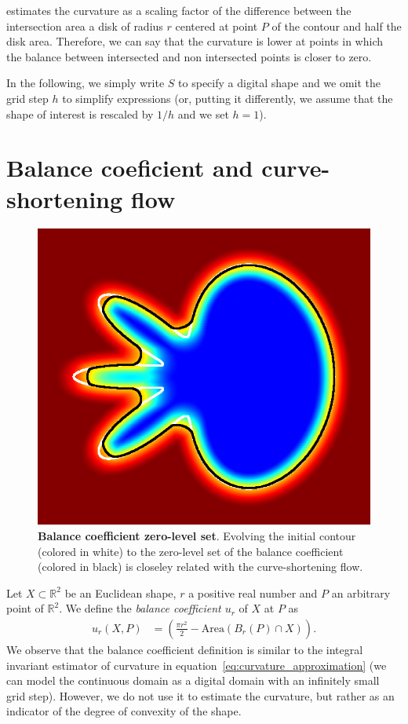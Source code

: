\documentclass[review]{siamart220329}
\newcommand{\R}{\mathbb{R}}
\begin{document}
 estimates the curvature as a scaling factor of the difference between the intersection area  a disk of radius $r$ centered at point $P$ of the contour and half the disk area. Therefore, we can say that the curvature is lower at points in which the balance between intersected and non intersected points is closer to zero.

In the following, we simply write $S$ to specify a digital shape and we omit the grid step $h$ to simplify expressions (or, putting it differently, we assume that the shape of interest is rescaled by $1/h$ and we set $h = 1$).
%
%
%
%
%
\section{Balance coeficient and curve-shortening flow}
%
%
\begin{figure}
 \center
 \includegraphics[scale=0.32]{figures/zero-level-set/balance-coefficient-zero-level-set.png}
 \caption{\textbf{Balance coefficient zero-level set}. Evolving the initial contour (colored in white) to the zero-level set of the balance coefficient (colored in black) is closeley related with the curve-shortening flow.}
 \label{fig:balance-coefficient-zero-level-set}
 \end{figure}
%
%
Let $X \subset \R^2$ be an Euclidean shape, $r$ a positive real number and $P$ an arbitrary point of $\R^2$. We define the \emph{balance coefficient $u_r$} of $X$ at $P$ as
%
%
\begin{align*}
  u_r(X,P) &= \left( \frac{\pi r^2}{2} - \text{Area}(B_r(P) \cap X) \right).
\end{align*}
%
%
We observe that the balance coefficient definition is similar to the
integral invariant estimator of curvature in
equation~\eqref{eq:curvature_approximation} (we can model the
continuous domain as a digital domain with an infinitely small grid
step). However, we do not use it to estimate the curvature, but rather
as an indicator of the degree of convexity of the shape.
\end{document}
